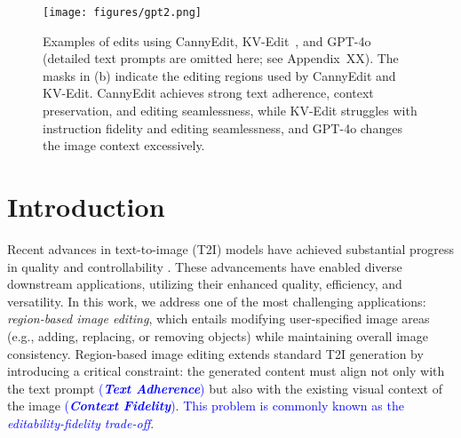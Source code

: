 \documentclass{article}
\newcommand{\kc}[1]{\textcolor{blue}{#1}}
\begin{document}
\begin{figure}[h!]
    \centering
    \texttt{[image: figures/gpt2.png]}
    \caption{Examples of edits using CannyEdit, KV-Edit~\citep{zhu2025kv}, and GPT-4o~\citep{OpenAI2025Introducing4O} (detailed text prompts are omitted here; see Appendix~XX). The masks in (b) indicate the editing regions used by CannyEdit and KV-Edit. CannyEdit achieves strong text adherence, context preservation, and editing seamlessness, while KV-Edit struggles with instruction fidelity and editing seamlessness, and GPT-4o changes the image context excessively.}
    \label{fig11}
\end{figure}
%
%
\section{Introduction}
\label{Sec:intro}
%

Recent advances in text-to-image (T2I) models have achieved substantial progress in quality and controllability \citep{rombach2022high,betker2023improving,chen2023pixart,esser2024scaling,blackforest2024FLUX}. These advancements have enabled diverse downstream applications, utilizing their enhanced quality, efficiency, and versatility. In this work, we address one of the most challenging applications: \emph{region-based image editing}, which entails modifying user-specified image areas (e.g., adding, replacing, or removing objects) while maintaining {overall image consistency}.
Region-based image editing extends standard T2I generation by introducing a critical constraint: the generated content must align not only with the text prompt \kc{(\textbf{\textit{Text Adherence}})} but also with the existing visual context of the image \kc{(\textbf{\textit{Context Fidelity}})}.
\kc{This problem is commonly known as the \textit{editability-fidelity trade-off}}.
\end{document}
